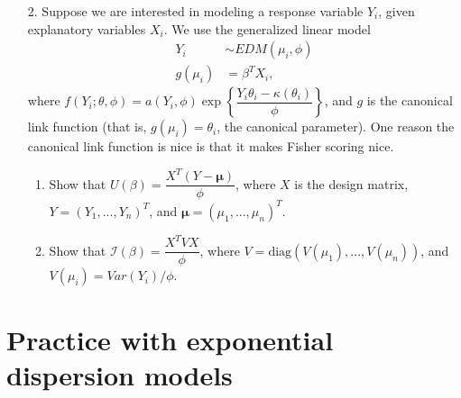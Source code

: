 \documentclass[11pt]{article}
\begin{document}
\begin{enumerate}
\item[2.] Suppose we are interested in modeling a response variable $Y_i$, given explanatory variables $X_i$. We use the generalized linear model
\begin{align*}
Y_i &\sim EDM(\mu_i, \phi) \\
g(\mu_i) &= \beta^T X_i,
\end{align*}
where $f(Y_i; \theta, \phi) = a(Y_i, \phi) \exp \left \lbrace \dfrac{Y_i \theta_i - \kappa(\theta_i)}{\phi} \right\rbrace$, and $g$ is the canonical link function (that is, $g(\mu_i) = \theta_i$, the canonical parameter). One reason the canonical link function is nice is that it makes Fisher scoring nice.

\begin{enumerate}
\item Show that $U(\beta) = \dfrac{X^T(Y - \bm{\mu})}{\phi}$, where $X$ is the design matrix, $Y = (Y_1,...,Y_n)^T$, and $\bm{\mu} = (\mu_1,...,\mu_n)^T$.

\item Show that $\mathcal{I}(\beta) = \dfrac{X^T V X}{\phi}$, where $V = \text{diag}(V(\mu_1),...,V(\mu_n))$, and $V(\mu_i) = Var(Y_i)/\phi$.
\end{enumerate}
\end{enumerate}

\section*{Practice with exponential dispersion models}
\end{document}
